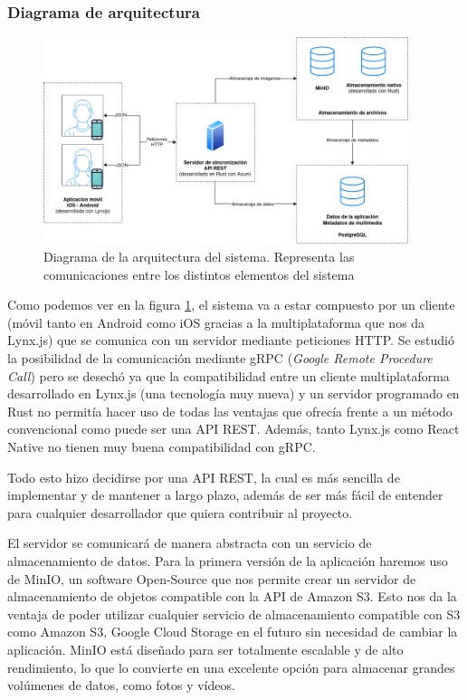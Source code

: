 \subsubsection{Diagrama de arquitectura}
\begin{figure}[H]
    \begin{center}
        \includegraphics[width=0.95\textwidth]{images/diagrama-arquitectura.png}
    \end{center}
    \caption{Diagrama de la arquitectura del sistema. Representa las comunicaciones entre los distintos elementos del sistema}\label{fig:diagrama-arquitectura}
\end{figure}

Como podemos ver en la figura \ref{fig:diagrama-arquitectura}, el sistema va a estar compuesto por un cliente (móvil tanto en Android como iOS gracias a la multiplataforma que nos da Lynx.js) que se comunica con un servidor mediante peticiones HTTP.
Se estudió la posibilidad de la comunicación mediante gRPC (\textit{Google Remote Procedure Call}) pero se desechó ya que la compatibilidad entre un cliente multiplataforma desarrollado en Lynx.js (una tecnología muy nueva) y un servidor programado en Rust no permitía hacer uso de todas las ventajas que ofrecía frente a un método convencional como puede ser una API REST. Además, tanto Lynx.js como React Native no tienen muy buena compatibilidad con gRPC.

Todo esto hizo decidirse por una API REST, la cual es más sencilla de implementar y de mantener a largo plazo, además de ser más fácil de entender para cualquier desarrollador que quiera contribuir al proyecto.

El servidor se comunicará de manera abstracta con un servicio de almacenamiento de datos. Para la primera versión de la aplicación haremos uso de MinIO, un software Open-Source que nos permite crear un servidor de almacenamiento de objetos compatible con la API de Amazon S3.
Esto nos da la ventaja de poder utilizar cualquier servicio de almacenamiento compatible con S3 como Amazon S3, Google Cloud Storage en el futuro sin necesidad de cambiar la aplicación.
MinIO está diseñado para ser totalmente escalable y de alto rendimiento, lo que lo convierte en una excelente opción para almacenar grandes volúmenes de datos, como fotos y vídeos.

